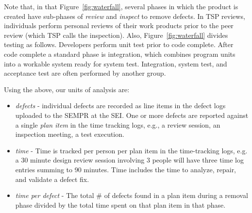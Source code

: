 \documentclass[smallcondesed]{svjour3}
\newcommand{\bi}{\begin{itemize}}%
\newcommand{\ei}{\end{itemize}}
\begin{document}
 


Note that, in that Figure~\ref{fig:waterfall},
several  phases in which the product is created have sub-phases of {\em review} and {\em inspect} to remove defects.
In TSP  reviews,  individuals perform personal reviews of their work products prior to the peer review
(which TSP calls the inspection).
Also, Figure~\ref{fig:waterfall} divides  testing     as follows. Developers perform unit test prior to code complete.  After code complete a standard phase is integration, which combines program units into a workable system ready for system test. Integration,  system test, and acceptance test are often performed by another group. 

 

Using the above,
our units of analysis are:
\bi
    \item \emph{defects} - individual defects are recorded as line items in the defect logs uploaded to the SEMPR at the SEI. One or more defects are reported against a single \emph{plan item} in the time tracking logs, e.g., a review session, an inspection meeting, a test execution.
    \item \emph{time} - Time is tracked per person per plan item in the time-tracking logs, e.g. a 30 minute design review session involving 3 people will have three time log entries summing to 90 minutes. Time includes the time to analyze, repair, and validate a defect fix.
    \item \emph{time per defect} - The total \# of defects found in a plan item during a removal phase divided by the total time spent on that plan item in that phase.
\ei
 
\end{document}
